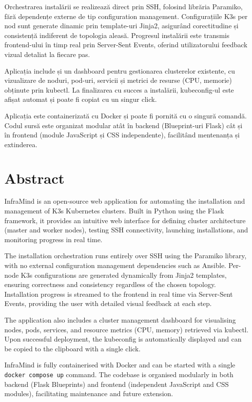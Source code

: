 \documentclass[12pt,a4paper]{report}
\begin{document}
Orchestrarea instalării se realizează direct prin SSH, folosind librăria Paramiko, fără dependențe externe de tip configuration management. Configurațiile K3s per nod sunt generate dinamic prin template-uri Jinja2, asigurând corectitudine și consistență indiferent de topologia aleasă. Progresul instalării este transmis frontend-ului în timp real prin Server-Sent Events, oferind utilizatorului feedback vizual detaliat la fiecare pas.

Aplicația include și un dashboard pentru gestionarea clusterelor existente, cu vizualizare de noduri, pod-uri, servicii și metrici de resurse (CPU, memorie) obținute prin kubectl. La finalizarea cu succes a instalării, kubeconfig-ul este afișat automat și poate fi copiat cu un singur click.

Aplicația este containerizată cu Docker și poate fi pornită cu o singură comandă. Codul sursă este organizat modular atât în backend (Blueprint-uri Flask) cât și în frontend (module JavaScript și CSS independente), facilitând mentenanța și extinderea.

\section*{Abstract}

InfraMind is an open-source web application for automating the installation and management of K3s Kubernetes clusters. Built in Python using the Flask framework, it provides an intuitive web interface for defining cluster architecture (master and worker nodes), testing SSH connectivity, launching installations, and monitoring progress in real time.

The installation orchestration runs entirely over SSH using the Paramiko library, with no external configuration management dependencies such as Ansible. Per-node K3s configurations are generated dynamically from Jinja2 templates, ensuring correctness and consistency regardless of the chosen topology. Installation progress is streamed to the frontend in real time via Server-Sent Events, providing the user with detailed visual feedback at each step.

The application also includes a cluster management dashboard for visualising nodes, pods, services, and resource metrics (CPU, memory) retrieved via kubectl. Upon successful deployment, the kubeconfig is automatically displayed and can be copied to the clipboard with a single click.

InfraMind is fully containerised with Docker and can be started with a single \texttt{docker compose up} command. The codebase is organised modularly in both backend (Flask Blueprints) and frontend (independent JavaScript and CSS modules), facilitating maintenance and future extension.
\end{document}
